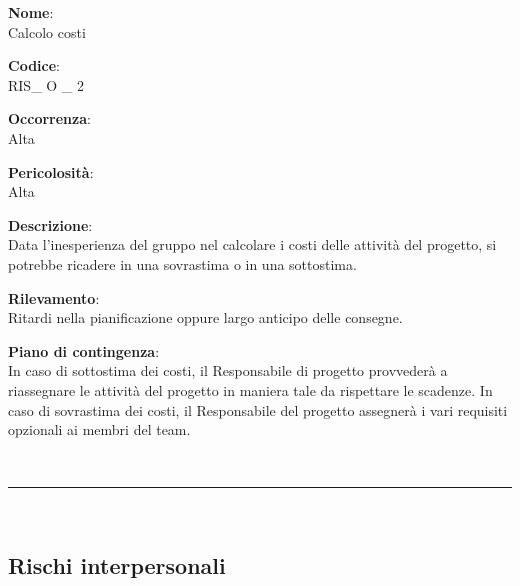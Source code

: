 {\setlength{\parindent}{0cm}
\begin{minipage}{\textwidth} 
\begin{multicols}{4}
\textbf{Nome}: \\ Calcolo costi \columnbreak

\textbf{Codice}: \\ RIS\_ O \_ 2 
\columnbreak

\textbf{Occorrenza}: \\ Alta 
\columnbreak

\textbf{Pericolosità}: \\ Alta

\end{multicols}

\begin{multicols}{3}

\textbf{Descrizione}: \\ Data l'inesperienza del gruppo nel calcolare i costi delle attività del progetto, si potrebbe ricadere in una sovrastima o in una sottostima.
\columnbreak

\textbf{Rilevamento}: \\ Ritardi nella pianificazione oppure largo anticipo delle consegne.
\columnbreak

\textbf{Piano di contingenza}: \\ In caso di sottostima dei costi, il Responsabile di progetto provvederà a riassegnare le attività del progetto in maniera tale da rispettare le scadenze. In caso di sovrastima dei costi, il Responsabile del progetto assegnerà i vari requisiti opzionali ai membri del team.
\\

\columnbreak
\end{multicols}
\end{minipage}} \\

\noindent\rule{\textwidth}{1pt}\\

\subsection{Rischi interpersonali}


